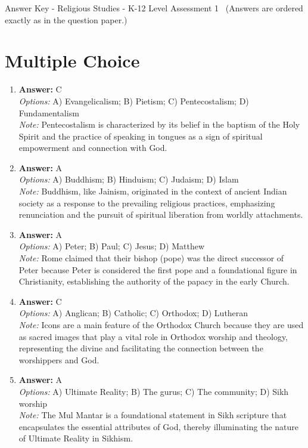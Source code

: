 \documentclass[12pt]{article}
\begin{document}
\begin{center}
Answer Key - Religious Studies - K-12 Level Assessment 1 \
\small (Answers are ordered exactly as in the question paper.)
\end{center}

\section*{Multiple Choice}
\begin{enumerate}[label=\arabic*.]
\item \textbf{Answer:} C
\\ \textit{Options:} A) Evangelicalism; B) Pietism; C) Pentecostalism; D) Fundamentalism
\\ \textit{Note:} Pentecostalism is characterized by its belief in the baptism of the Holy Spirit and the practice of speaking in tongues as a sign of spiritual empowerment and connection with God.
\item \textbf{Answer:} A
\\ \textit{Options:} A) Buddhism; B) Hinduism; C) Judaism; D) Islam
\\ \textit{Note:} Buddhism, like Jainism, originated in the context of ancient Indian society as a response to the prevailing religious practices, emphasizing renunciation and the pursuit of spiritual liberation from worldly attachments.
\item \textbf{Answer:} A
\\ \textit{Options:} A) Peter; B) Paul; C) Jesus; D) Matthew
\\ \textit{Note:} Rome claimed that their bishop (pope) was the direct successor of Peter because Peter is considered the first pope and a foundational figure in Christianity, establishing the authority of the papacy in the early Church.
\item \textbf{Answer:} C
\\ \textit{Options:} A) Anglican; B) Catholic; C) Orthodox; D) Lutheran
\\ \textit{Note:} Icons are a main feature of the Orthodox Church because they are used as sacred images that play a vital role in Orthodox worship and theology, representing the divine and facilitating the connection between the worshippers and God.
\item \textbf{Answer:} A
\\ \textit{Options:} A) Ultimate Reality; B) The gurus; C) The community; D) Sikh worship
\\ \textit{Note:} The Mul Mantar is a foundational statement in Sikh scripture that encapsulates the essential attributes of God, thereby illuminating the nature of Ultimate Reality in Sikhism.
\end{enumerate}
\end{document}
